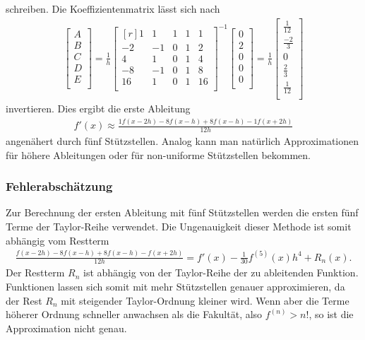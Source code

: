 schreiben.
Die Koeffizientenmatrix lässt sich nach
\begin{align}
\begin{bmatrix}
A \\
B \\
C \\
D \\
E \\
\end{bmatrix}
=
\frac{1}{h}
\begin{bmatrix*}[r]
1 & 1 & 1 & 1 & 1 \\
-2 & -1 & 0 & 1 & 2 \\
4 & 1 & 0 & 1 & 4 \\
-8 & -1 & 0 & 1 & 8 \\
16 & 1 & 0 & 1 & 16 \\
\end{bmatrix*}^{-1}
\begin{bmatrix}
0 \\
2 \\
0 \\
0 \\
0 \\
\end{bmatrix}
=
\frac{1}{h}
\begin{bmatrix}
\frac{1}{12} \\
\frac{-2}{3} \\
0 \\
\frac{2}{3} \\
\frac{1}{12} \\
\end{bmatrix}
\end{align}
invertieren.
Dies ergibt die erste Ableitung
\begin{align}
f'(x)  \approx \frac{1f(x-2h) - 8f(x-h) + 8f(x-h) - 1f(x+2h)}{12h}
\label{ableitung:eqn:aprox_5}
\end{align}
angenähert durch fünf Stützstellen.
Analog kann man natürlich Approximationen für höhere Ableitungen oder
für non-uniforme Stützstellen bekommen.

\subsubsection{Fehlerabschätzung}
%
Zur Berechnung der ersten Ableitung mit fünf Stützstellen werden die ersten fünf Terme der Taylor-Reihe verwendet.
Die Ungenauigkeit dieser Methode ist somit abhängig vom Restterm
%
\begin{align}
\frac{f(x-2h) - 8f(x-h) + 8f(x-h) - f(x+2h)}{12h} = f'(x) - \frac{1}{30} f^{(5)} (x)h^{4}+R_n(x) \text{.}
\label{ableitung:eqn:error}
\end{align}
Der Restterm $R_{n}$ ist abhängig von der Taylor-Reihe der zu ableitenden Funktion.
Funktionen lassen sich somit mit mehr Stützstellen genauer approximieren, da der Rest $R_n$ mit steigender Taylor-Ordnung kleiner wird.
Wenn aber die Terme höherer Ordnung schneller anwachsen als die Fakultät,
also $f^{(n)} > n!$,
so ist die Approximation nicht genau.

